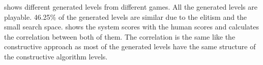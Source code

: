 

 shows different generated levels from different games.  All the generated levels are playable. 46.25\% of the generated levels are similar due to the elitism and the small search space.  shows the system scores with the human scores and calculates the correlation between both of them. The correlation is the same like the constructive approach as most of the generated levels have the same structure of the constructive algorithm levels.


